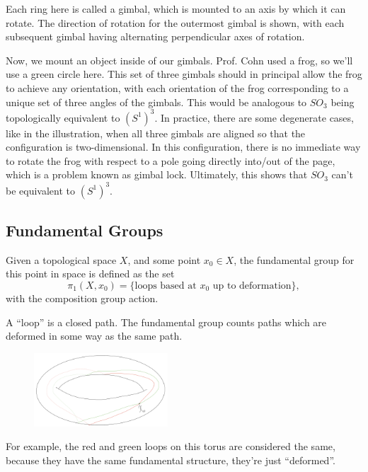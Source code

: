 Each ring here is called a \ac{gimbal}, which is mounted to an axis by which it can rotate. The direction of rotation for the outermost gimbal is shown, with each subsequent gimbal having alternating perpendicular axes of rotation.

Now, we mount an object inside of our gimbals. Prof. Cohn used a frog, so we'll use a green circle here. This set of three gimbals should in principal allow the frog to achieve any orientation, with each orientation of the frog corresponding to a unique set of three angles of the gimbals. This would be analogous to $SO_3$ being topologically equivalent to $(S^1)^3$. In practice, there are some degenerate cases, like in the illustration, when all three gimbals are aligned so that the configuration is two-dimensional. In this configuration, there is no immediate way to rotate the frog with respect to a pole going directly into/out of the page, which is a problem known as \ac{gimbal lock}. Ultimately, this shows that $SO_3$ can't be equivalent to $(S^1)^3$. 

\subsection{Fundamental Groups}

\begin{definition}

Given a topological space $X$, and some point $x_0\in X$, the \ac{fundamental group} for this point in space is defined as the set 
\[\pi_1(X, x_0) = \{\text{loops based at }x_0\text{ up to deformation}\},\]
with the composition group action.
\end{definition}

A ``loop'' is a closed path. The fundamental group counts paths which are deformed in some way as the same path. 

\begin{figure}[H]
    \centering
    \includegraphics[width=5cm]{images/torus.png}
\end{figure}

For example, the red and green loops on this torus are considered the same, because they have the same fundamental structure, they're just ``deformed''.


